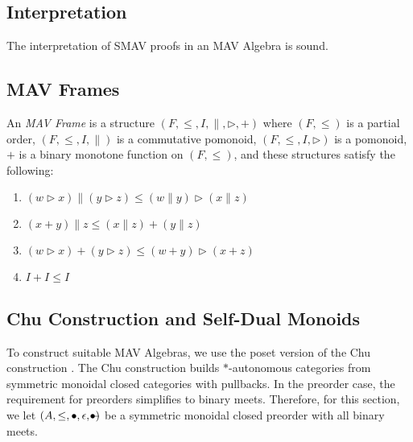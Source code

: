 
\subsection{Interpretation}

\begin{theorem}
  The interpretation of SMAV proofs in an MAV Algebra is sound. 
\end{theorem}

\subsection{MAV Frames}

\begin{definition}
  An \emph{MAV Frame} is a structure
  $(F, \leq, I, \parallel, \rhd, +)$ where $(F, \leq)$ is a partial
  order, $(F, \leq, I, \parallel)$ is a commutative pomonoid,
  $(F, \leq, I, \rhd)$ is a pomonoid, $+$ is a binary monotone
  function on $(F, \leq)$, and these structures satisfy the following:
  \begin{enumerate}
  \item $(w \rhd x) \parallel (y \rhd z) \leq (w \parallel y) \rhd (x \parallel z)$
  \item $(x + y) \parallel z \leq (x \parallel z) + (y \parallel z)$
  \item $(w \rhd x) + (y \rhd z) \leq (w + y) \rhd (x + z)$
  \item $I + I \leq I$
  \end{enumerate}
\end{definition}

\begin{remark}
\end{remark}

\begin{proposition}
\end{proposition}

\subsection{Chu Construction and Self-Dual Monoids}

\newcommand{\Chu}{\mathrm{Chu}}
\newcommand{\op}{\mathrm{op}}

To construct suitable MAV Algebras, we use the poset version of the
Chu construction \cite{barr}. The Chu construction builds
$*$-autonomous categories from symmetric monoidal closed categories
with pullbacks. In the preorder case, the requirement for preorders
simplifies to binary meets. Therefore, for this section, we let
$(A, \leq, \bullet, \epsilon, -\kern-9pt\bullet)$ be a symmetric
monoidal closed preorder with all binary meets.


